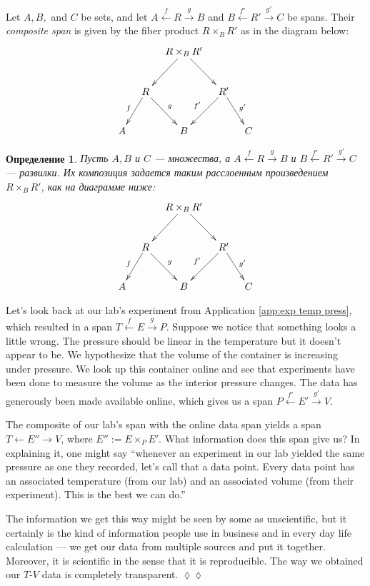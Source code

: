\documentclass[a4paper]{book}
\def\to{\rightarrow}
\def\from{\leftarrow}
\newcommand{\To}[1]{\xrightarrow{#1}}
\newcommand{\From}[1]{\xleftarrow{#1}}
\theoremstyle{myth}
\newtheorem{appENG}[envENG]{\begin{english}Application\end{english}}
\newtheorem{definitionENG}[envENG]{\begin{english}Definition\end{english}}
\newenvironment{applicationENG}{\begin{appENG}}{\hspace*{\fill}$\lozenge\lozenge$\end{appENG}}
\newtheorem{definitionRUS}[envRUS]{Определение}
\begin{document}
\begin{russian}
\begin{definitionENG}\label{def:composite span}
Let $A,B,$ and $C$ be sets, and let $A\From{f}R\To{g}B$ and $B\From{f'}R'\To{g'}C$ be spans. Their {\em composite span} is given by the fiber product $R\times_BR'$ as in the diagram below:
$$
\xymatrix@=10pt{&&R\times_BR'\ar[ldd]\ar[rdd]\\\\&R\ar[ddl]_f\ar[ddr]^g&&R'\ar[ddl]_{f'}\ar[ddr]^{g'}\\\\A&&B&&C
}$$
\end{definitionENG}

\begin{definitionRUS}\label{def:composite span}
Пусть $A,B$ и $C$ — множества, а $A\From{f}R\To{g}B$ и $B\From{f'}R'\To{g'}C$ — развилки. Их {\em композиция} задается таким расслоенным произведением $R\times_BR'$, как на диаграмме ниже:
$$
\xymatrix@=10pt{&&R\times_BR'\ar[ldd]\ar[rdd]\\\\&R\ar[ddl]_f\ar[ddr]^g&&R'\ar[ddl]_{f'}\ar[ddr]^{g'}\\\\A&&B&&C
}$$
\end{definitionRUS}

\begin{applicationENG}\label{app:exp temp press 2}
Let's look back at our lab's experiment from Application \ref{app:exp temp press}, which resulted in a span $T\From{f}E\To{g}P$. Suppose we notice that something looks a little wrong. The pressure should be linear in the temperature but it doesn't appear to be. We hypothesize that the volume of the container is increasing under pressure. We look up this container online and see that experiments have been done to measure the volume as the interior pressure changes. The data has generously been made available online, which gives us a span $P\From{f'}E'\To{g'}V$. 

The composite of our lab's span with the online data span yields a span $T\from E''\to V$, where $E'':=E\times_PE'$. What information does this span give us? In explaining it, one might say “whenever an experiment in our lab yielded the same pressure as one they recorded, let's call that a data point. Every data point has an associated temperature (from our lab) and an associated volume (from their experiment). This is the best we can do.” 

The information we get this way might be seen by some as unscientific, but it certainly is the kind of information people use in business and in every day life calculation — we get our data from multiple sources and put it together. Moreover, it is scientific in the sense that it is reproducible. The way we obtained our $T$-$V$ data is completely transparent.
\end{applicationENG}


\end{russian}
\end{document}
